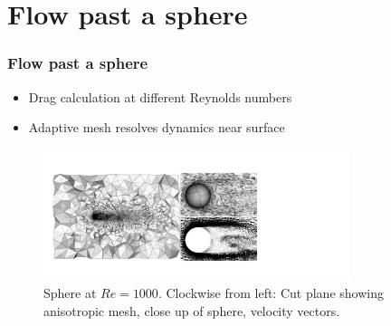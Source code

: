 \section{Flow past a sphere}

\begin{frame}
    \frametitle{Flow past a sphere}
\begin{itemize}
\item Drag calculation at different Reynolds numbers
\item Adaptive mesh resolves dynamics near surface
\end{itemize}
\begin{figure}
\centering
\includegraphics[width=0.8\textwidth]{./flow_past_sphere/sphere-Re1000-combined.pdf}
\caption{Sphere at $Re = 1000$. Clockwise from left: Cut plane showing anisotropic mesh, close up of sphere, velocity vectors.}
\end{figure}
\end{frame}

